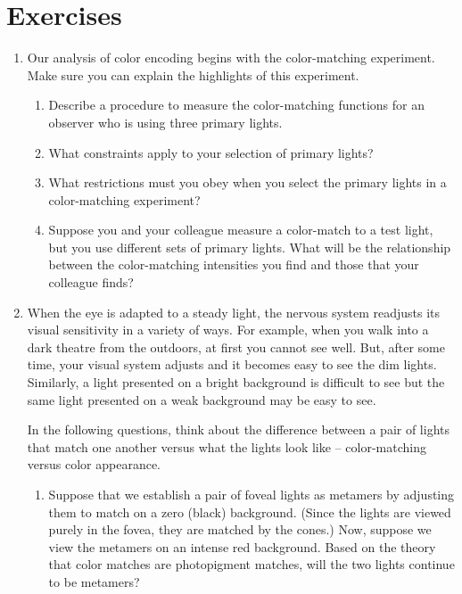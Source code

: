 %
%
\nocite{Baylor1973}

\newpage
\section*{Exercises}

\begin{enumerate}

\item  Our analysis of color encoding
begins with the color-matching experiment.
Make sure you can explain the highlights of this experiment.

 \begin{enumerate}

 \item  Describe a procedure to measure
the color-matching functions for
an observer who is using three primary lights.

 \item What constraints apply to your selection of primary lights?

 \item What restrictions must you obey when
you select the primary lights in a color-matching experiment?

 \item Suppose you and your colleague measure a color-match to
a test light, but you use different sets of primary lights.
What will be the relationship between
the color-matching intensities you find
and those that your colleague finds?

 \end{enumerate}

\item When the eye is adapted to a steady light,
the nervous system readjusts its visual sensitivity in a
variety of ways.
For example, when you walk into a dark theatre from
the outdoors, at first you cannot see well.
But, after some time, your visual system adjusts
and it becomes easy to see the dim lights.
Similarly, a light presented on a bright background is
difficult to see but the same light presented on
a weak background may be easy to see.

In the following questions, think about the
difference between a pair of lights that match
one another versus what the lights look like -- color-matching
versus color appearance.

 \begin{enumerate}

 \item Suppose that we establish a pair of foveal lights
as metamers by adjusting them to match on a zero (black)
background.
(Since the lights are viewed purely in the fovea, they
are matched by the cones.)
Now, suppose we view the metamers
on an intense red background.
Based on the theory that color matches are photopigment
matches, will the two lights continue to be metamers?


\end{enumerate}
\end{enumerate}
